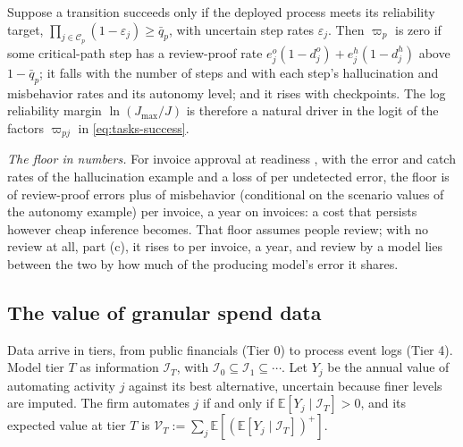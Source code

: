 \begin{corollary}\label{cor:tasks-failure-success}
Suppose a transition succeeds only if the deployed process meets its reliability target, $\prod_{j\in\mathcal C_p}(1-\varepsilon_j)\ge\bar q_p$, with uncertain step rates $\varepsilon_j$. Then $\varpi_p$ is zero if some critical-path step has a review-proof rate $e^o_j(1-d^o_j)+e^h_j(1-d^h_j)$ above $1-\bar q_p$; it falls with the number of steps and with each step's hallucination and misbehavior rates and its autonomy level; and it rises with checkpoints. The log reliability margin $\ln(J_{\max}/J)$ is therefore a natural driver in the logit of the factors $\varpi_{pj}$ in \eqref{eq:tasks-success}.
\end{corollary}

\noindent\emph{The floor in numbers.} For invoice approval at readiness \icIotaHigh, with the error and catch rates of the hallucination example and a loss of \icAutL{} per undetected error, the floor is \icCerrFloor{} of review-proof errors plus \icCerrMis{} of misbehavior (conditional on the scenario values of the autonomy example) per invoice, \icCerrAnnual{} a year on \icVolume{} invoices: a cost that persists however cheap inference becomes. That floor assumes people review; with no review at all, part (c), it rises to \icCerrNoRev{} per invoice, \icCerrNoRevAnnual{} a year, and review by a model lies between the two by how much of the producing model's error it shares.

\subsection{The value of granular spend data}\label{sec:tasks-granularity}

Data arrive in tiers, from public financials (Tier 0) to process event logs (Tier 4). Model tier $T$ as information $\mathcal I_T$, with $\mathcal I_0\subseteq\mathcal I_1\subseteq\cdots$. Let $Y_j$ be the annual value of automating activity $j$ against its best alternative, uncertain because finer levels are imputed. The firm automates $j$ if and only if $\mathbb E[Y_j\mid\mathcal I_T]>0$, and its expected value at tier $T$ is $\mathcal V_T:=\sum_j\mathbb E[(\mathbb E[Y_j\mid\mathcal I_T])^+]$.

